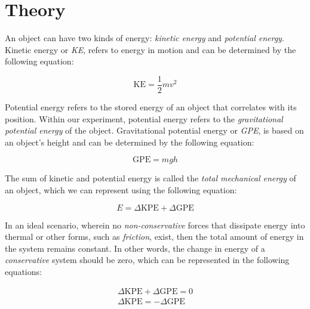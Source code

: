 \section{Theory}
\vspace{-0.5cm}
\singlespacing

An object can have two kinds of energy: \textit{kinetic energy} and \textit{potential energy}. Kinetic energy or \textit{KE}, refers to energy in motion and can be determined by the following equation:

\begin{equation*}
	\text{KE} = \frac{1}{2}mv^2
\end{equation*}

Potential energy refers to the stored energy of an object that correlates with its position. Within our experiment, potential energy refers to the \textit{gravitational potential energy} of the object. Gravitational potential energy or \textit{GPE}, is based on an object's height and can be determined by the following equation:

\begin{equation*}
	\text{GPE} = mgh	
\end{equation*}

The sum of kinetic and potential energy is called the \textit{total mechanical energy} of an object, which we can represent using the following equation:

\begin{equation}
	E = \Delta{\text{KPE}} + \Delta{\text{GPE}} 
	\label{eq:totalMechE}
\end{equation}

In an ideal scenario, wherein no \textit{non-conservative} forces that dissipate energy into thermal or other forms, such as \textit{friction}, exist, then the total amount of energy in the system remains constant. In other words, the change in energy of a \textit{conservative} system should be zero, which can be represented in the following equations:

\begin{align*}
	\Delta{\text{KPE}} + \Delta{\text{GPE}} = 0 \\ 
	\Delta{\text{KPE}} = -\Delta{\text{GPE}} 
\end{align*}

\newpage
